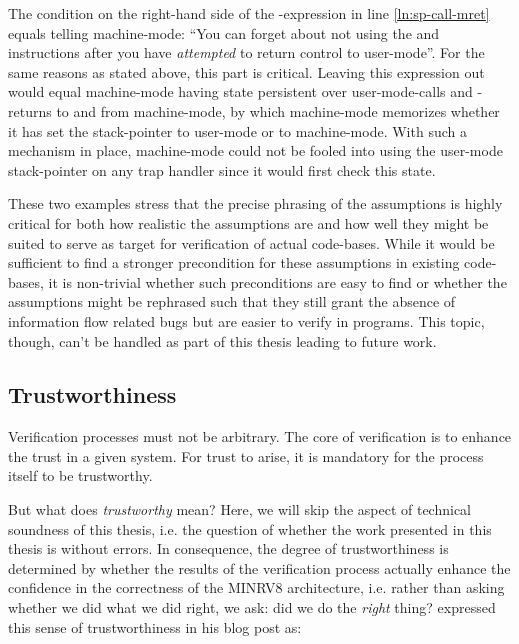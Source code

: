 The condition  on the right-hand side of the -expression in line \ref{ln:sp-call-mret} equals telling machine-mode: \enquote{You can forget about not using the  and  instructions after you have \textit{attempted} to return control to user-mode}.
For the same reasons as stated above, this part is critical.
Leaving this expression out would equal machine-mode having state persistent over user-mode-calls and -returns to and from machine-mode, by which machine-mode memorizes whether it has set the stack-pointer to user-mode or to machine-mode.
With such a mechanism in place, machine-mode could not be fooled into using the user-mode stack-pointer on any trap handler since it would first check this state.

These two examples stress that the precise phrasing of the assumptions is highly critical for both how realistic the assumptions are and how well they might be suited to serve as target for verification of actual code-bases.
While it would be sufficient to find a stronger precondition for these assumptions in existing code-bases, it is non-trivial whether such preconditions are easy to find or whether the assumptions might be rephrased such that they still grant the absence of information flow related bugs but are easier to verify in programs.
This topic, though, can't be handled as part of this thesis leading to future work.

\subsection{Trustworthiness}

Verification processes must not be arbitrary.
The core of verification is to enhance the trust in a given system.
For trust to arise, it is mandatory for the process itself to be trustworthy.

But what does \textit{trustworthy} mean?
Here, we will skip the aspect of technical soundness of this thesis, i.e. the question of whether the work presented in this thesis is without errors.
In consequence, the degree of trustworthiness is determined by whether the results of the verification process actually enhance the confidence in the correctness of the MINRV8 architecture, i.e. rather than asking whether we did what we did right, we ask: did we do the \textit{right} thing?
\citeauthor{Piano} expressed this sense of trustworthiness in his blog post  as:

